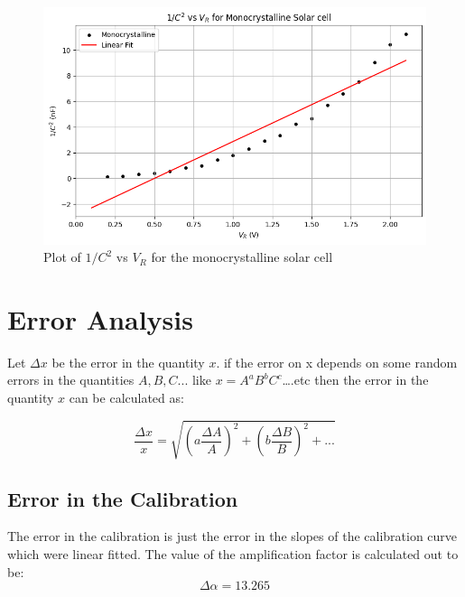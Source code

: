 \documentclass{article}
\begin{document}
\begin{multicols}{2}
\begin{figure}[H]
    \centering
    \includegraphics[width=\columnwidth]{Images/CV_mono_2.png}
    \caption{Plot of $1/C^2$ vs $V_R$ for the monocrystalline solar cell}
    \label{CV_mono_2}
\end{figure}

\section{Error Analysis}


Let $\Delta x$ be the error in the quantity $x$. if the error on x depends on some random errors in the quantities $A, B, C . . .$ like $x=A^a B^b C^c$….etc then the error in the quantity $x$ can be calculated as:


\begin{equation}
    \frac{\Delta x}{x} = \sqrt{(a \frac{\Delta A}{A})^2 + (b \frac{\Delta B}{B})^2 + ...}
    \label{errformula}
\end{equation}

\subsection{Error in the Calibration}

The error in the calibration is just the error in the slopes of the calibration curve which were linear fitted. The value of the amplification factor is calculated out to be:
\begin{equation}
    \Delta \alpha = 13.265 
\end{equation}


\end{multicols}
\end{document}

